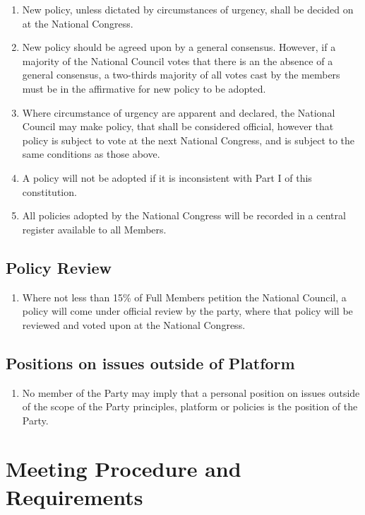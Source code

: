 \documentclass[a4paper,titlepage,8.5pt]{article}
\begin{document}
\begin{enumerate}
\item New policy, unless dictated by circumstances of urgency, shall be decided on at the National Congress.
\item New policy should be agreed upon by a general consensus. However, if a majority of the National Council votes that there is an the absence of a general consensus, a two-thirds majority of all votes cast by the members must be in the affirmative for new policy to be adopted. 
\item Where circumstance of urgency are apparent and declared, the National Council may make policy, that shall be considered official, however that policy is subject to vote at the next National Congress, and is subject to the same conditions as those above. 
\item A policy will not be adopted if it is inconsistent with Part I of this constitution.
\item All policies adopted by the National Congress will be recorded in a central register available to all Members.
\end{enumerate}

\subsection{Policy Review}

\begin{enumerate}
\item Where not less than 15\% of Full Members petition the National Council, a policy will come under official review by the party, where that policy will be reviewed and voted upon at the National Congress.
\end{enumerate}

\subsection{Positions on issues outside of Platform}

\begin{enumerate}
\item No member of the Party may imply that a personal position on issues outside of the scope of the Party principles, platform or policies is the position of the Party.
\end{enumerate}

\section{Meeting Procedure and Requirements}
\end{document}
